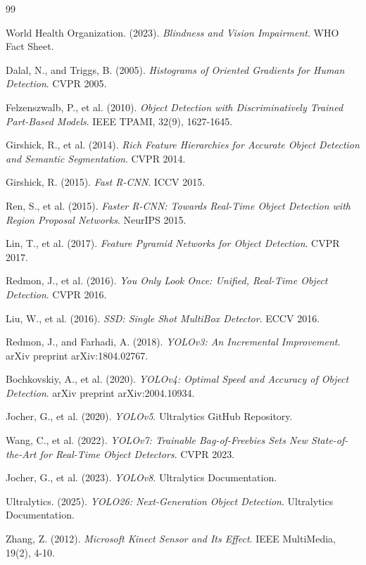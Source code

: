 \documentclass[12pt,a4paper]{report}
\begin{document}
\begin{thebibliography}{99}

World Health Organization. (2023). \textit{Blindness and Vision Impairment}. WHO Fact Sheet.

Dalal, N., and Triggs, B. (2005). \textit{Histograms of Oriented Gradients for Human Detection}. CVPR 2005.

Felzenszwalb, P., et al. (2010). \textit{Object Detection with Discriminatively Trained Part-Based Models}. IEEE TPAMI, 32(9), 1627-1645.

Girshick, R., et al. (2014). \textit{Rich Feature Hierarchies for Accurate Object Detection and Semantic Segmentation}. CVPR 2014.

Girshick, R. (2015). \textit{Fast R-CNN}. ICCV 2015.

Ren, S., et al. (2015). \textit{Faster R-CNN: Towards Real-Time Object Detection with Region Proposal Networks}. NeurIPS 2015.

Lin, T., et al. (2017). \textit{Feature Pyramid Networks for Object Detection}. CVPR 2017.

Redmon, J., et al. (2016). \textit{You Only Look Once: Unified, Real-Time Object Detection}. CVPR 2016.

Liu, W., et al. (2016). \textit{SSD: Single Shot MultiBox Detector}. ECCV 2016.

Redmon, J., and Farhadi, A. (2018). \textit{YOLOv3: An Incremental Improvement}. arXiv preprint arXiv:1804.02767.

Bochkovskiy, A., et al. (2020). \textit{YOLOv4: Optimal Speed and Accuracy of Object Detection}. arXiv preprint arXiv:2004.10934.

Jocher, G., et al. (2020). \textit{YOLOv5}. Ultralytics GitHub Repository.

Wang, C., et al. (2022). \textit{YOLOv7: Trainable Bag-of-Freebies Sets New State-of-the-Art for Real-Time Object Detectors}. CVPR 2023.

Jocher, G., et al. (2023). \textit{YOLOv8}. Ultralytics Documentation.

Ultralytics. (2025). \textit{YOLO26: Next-Generation Object Detection}. Ultralytics Documentation.

Zhang, Z. (2012). \textit{Microsoft Kinect Sensor and Its Effect}. IEEE MultiMedia, 19(2), 4-10.


\end{thebibliography}
\end{document}
